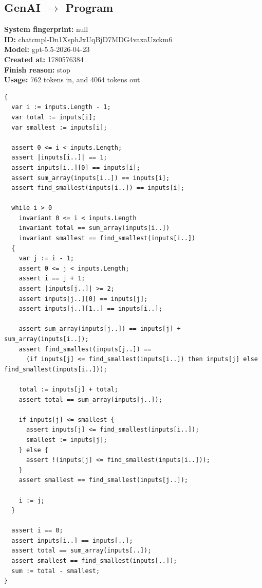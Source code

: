 \documentclass{article}
\begin{document}
\subsection*{GenAI $\rightarrow$ Program}
\textbf{System fingerprint: }null
\\\textbf{ID: }chatcmpl-Dn1XsphJxUqBjD7MDG4vaxaUzckm6
\\\textbf{Model: }gpt-5.5-2026-04-23
\\\textbf{Created at: }1780576384
\\\textbf{Finish reason: }stop
\\\textbf{Usage: }762 tokens in, and 4064 tokens out
\begin{lstlisting}
{
  var i := inputs.Length - 1;
  var total := inputs[i];
  var smallest := inputs[i];

  assert 0 <= i < inputs.Length;
  assert |inputs[i..]| == 1;
  assert inputs[i..][0] == inputs[i];
  assert sum_array(inputs[i..]) == inputs[i];
  assert find_smallest(inputs[i..]) == inputs[i];

  while i > 0
    invariant 0 <= i < inputs.Length
    invariant total == sum_array(inputs[i..])
    invariant smallest == find_smallest(inputs[i..])
  {
    var j := i - 1;
    assert 0 <= j < inputs.Length;
    assert i == j + 1;
    assert |inputs[j..]| >= 2;
    assert inputs[j..][0] == inputs[j];
    assert inputs[j..][1..] == inputs[i..];

    assert sum_array(inputs[j..]) == inputs[j] + sum_array(inputs[i..]);
    assert find_smallest(inputs[j..]) ==
      (if inputs[j] <= find_smallest(inputs[i..]) then inputs[j] else find_smallest(inputs[i..]));

    total := inputs[j] + total;
    assert total == sum_array(inputs[j..]);

    if inputs[j] <= smallest {
      assert inputs[j] <= find_smallest(inputs[i..]);
      smallest := inputs[j];
    } else {
      assert !(inputs[j] <= find_smallest(inputs[i..]));
    }
    assert smallest == find_smallest(inputs[j..]);

    i := j;
  }

  assert i == 0;
  assert inputs[i..] == inputs[..];
  assert total == sum_array(inputs[..]);
  assert smallest == find_smallest(inputs[..]);
  sum := total - smallest;
}
\end{lstlisting}
\end{document}
